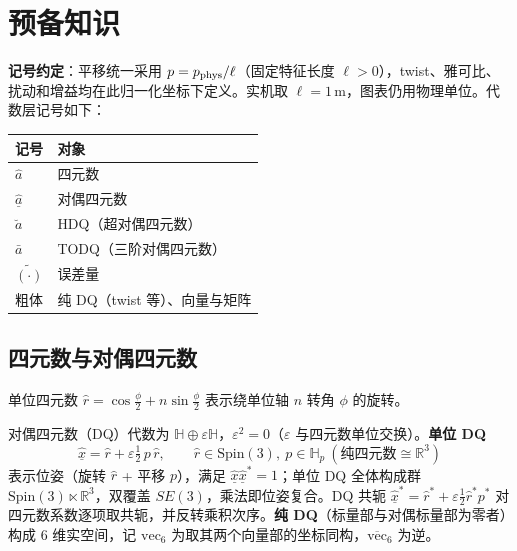 \section{预备知识}

\textbf{记号约定}：平移统一采用 $p=p_{\rm phys}/\ell$（固定特征长度 $\ell>0$），twist、雅可比、扰动和增益均在此归一化坐标下定义。实机取 $\ell=1\,\mathrm m$，图表仍用物理单位。代数层记号如下：

\begin{center}
\begin{tabularx}{\linewidth}{@{}lX@{}}
\toprule
记号 & 对象  \\
\midrule
$\hat a$ & 四元数 \\
$\hat{\underline a}$ & 对偶四元数 \\
$\breve a$ & HDQ（超对偶四元数） \\
$\bar a$ & TODQ（三阶对偶四元数） \\
$\tilde{(\cdot)}$ & 误差量 \\
粗体 & 纯 DQ（twist 等）、向量与矩阵  \\
\bottomrule
\end{tabularx}
\end{center}

\subsection{四元数与对偶四元数}

单位四元数 $\hat r=\cos\frac\phi2+n\sin\frac\phi2$ 表示绕单位轴 $n$ 转角 $\phi$ 的旋转。

对偶四元数（DQ）代数为 $\mathbb H\oplus\varepsilon\mathbb H$，$\varepsilon^2=0$（$\varepsilon$ 与四元数单位交换）。\textbf{单位 DQ}
\begin{equation}
\hat{\underline x}=\hat r+\varepsilon\tfrac12\,p\,\hat r,\qquad \hat r\in\mathrm{Spin}(3),\ p\in\mathbb H_p\ (\text{纯四元数}\cong\mathbb R^3)
\tag{2.1}\label{eq:2.1}
\end{equation}
表示位姿（旋转 $\hat r$ + 平移 $p$），满足 $\hat{\underline x}\hat{\underline x}^*=1$；单位 DQ 全体构成群 $\mathrm{Spin}(3)\ltimes\mathbb R^3$，双覆盖 $SE(3)$，乘法即位姿复合。DQ 共轭 $\hat{\underline x}^*=\hat r^*+\varepsilon\tfrac12\hat r^*p^*$ 对四元数系数逐项取共轭，并反转乘积次序。\textbf{纯 DQ}（标量部与对偶标量部为零者）构成 6 维实空间，记 $\mathrm{vec}_6$ 为取其两个向量部的坐标同构，$\overline{\mathrm{vec}}_6$ 为逆。

